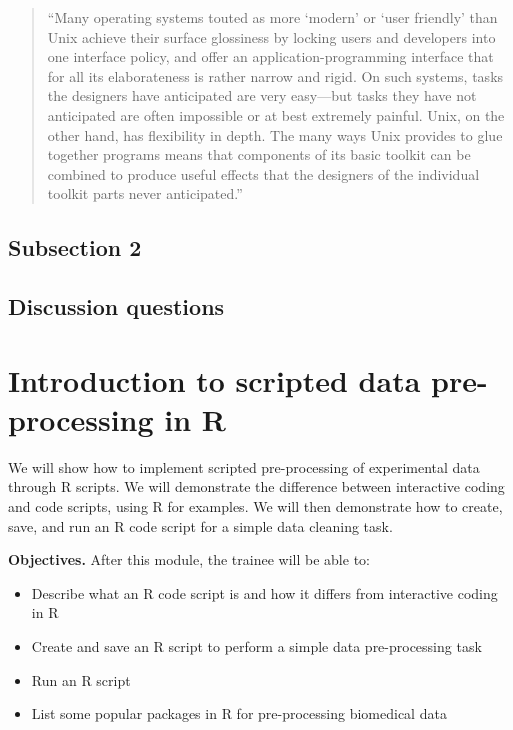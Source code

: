 \documentclass[]{tufte-book}
\providecommand{\tightlist}{%
  \setlength{\itemsep}{0pt}\setlength{\parskip}{0pt}}
\begin{document}
\begin{quote}
``Many operating systems touted as more `modern' or `user friendly' than Unix achieve their
surface glossiness by locking users and developers into one interface policy, and offer an
application-programming interface that for all its elaborateness is rather narrow and rigid.
On such systems, tasks the designers have anticipated are very easy---but tasks they have
not anticipated are often impossible or at best extremely painful. Unix, on the other hand, has
flexibility in depth. The many ways Unix provides to glue together programs means that components
of its basic toolkit can be combined to produce useful effects that the designers of the individual
toolkit parts never anticipated.'' \citep{raymond2003art}
\end{quote}

\hypertarget{subsection-2-6}{%
\subsection{Subsection 2}\label{subsection-2-6}}

\hypertarget{discussion-questions-5}{%
\subsection{Discussion questions}\label{discussion-questions-5}}

\hypertarget{introduction-to-scripted-data-pre-processing-in-r}{%
\section{Introduction to scripted data pre-processing in R}\label{introduction-to-scripted-data-pre-processing-in-r}}

We will show how to implement scripted pre-processing of experimental data
through R scripts. We will demonstrate the difference between interactive coding
and code scripts, using R for examples. We will then demonstrate how to create,
save, and run an R code script for a simple data cleaning task.

\textbf{Objectives.} After this module, the trainee will be able to:

\begin{itemize}
\tightlist
\item
  Describe what an R code script is and how it differs from interactive
  coding in R
\item
  Create and save an R script to perform a simple data pre-processing task
\item
  Run an R script
\item
  List some popular packages in R for pre-processing biomedical data
\end{itemize}
\end{document}
